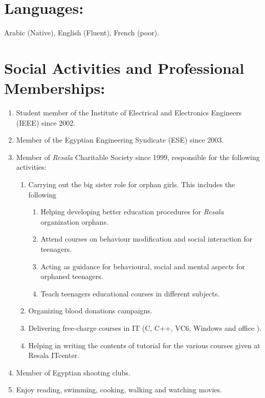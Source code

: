 \documentclass{article}
\begin{document}
\section*{Languages:}

Arabic (Native), English (Fluent), French (poor).


 \section*{Social Activities and Professional Memberships:}

\begin{enumerate}
\item  Student member of the Institute of Electrical and Electronics Engineers
(IEEE) since 2002.
\item  Member of the Egyptian Engineering Syndicate (ESE) since 2003.
\item  Member of \textit{Resala} Charitable Society since 1999, responsible for
the following activities:
\begin{enumerate}
\item  Carrying out the big sister role for orphan girls. This includes the following
  \begin{enumerate}
\item Helping developing better education procedures for \textit{Resala}
organization orphans.
\item Attend courses on behaviour modification and  social interaction for
teenagers.
\item Acting as guidance for behavioural, social and mental aspects for orphaned
teenagers.

\item Teach teenagers educational courses in different subjects.
\end{enumerate}
\item  Organizing blood donations campaigns.
\item  Delivering free-charge courses in IT (C, C++, VC6, Windows and office ).
\item  Helping in writing the contents of tutorial for the various courses given at Resala ITcenter.
\end{enumerate}
\item  Member of Egyptian shooting clubs.
\item  Enjoy reading, swimming, cooking, walking and watching movies.
\end{enumerate}
%
%
\end{document}
